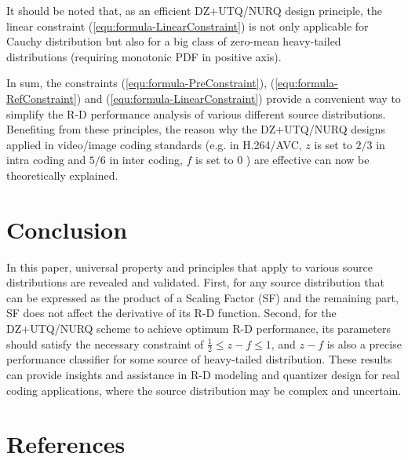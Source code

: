 \documentclass[smallabstract,smallcaptions]{dccpaper}
\begin{document}
It should be noted that, as an efficient DZ+UTQ/NURQ design principle, the linear constraint (\ref{equ:formula-LinearConstraint}) is not only applicable for Cauchy distribution but also for a big class of zero-mean heavy-tailed distributions (requiring monotonic PDF in positive axis).

In sum, the constraints (\ref{equ:formula-PreConstraint}), (\ref{equ:formula-RefConstraint}) and (\ref{equ:formula-LinearConstraint}) provide a convenient way to simplify the R-D performance analysis of various different source distributions. Benefiting from these principles, the reason why the DZ+UTQ/NURQ designs applied in video/image coding standards (e.g. in H.264/AVC, $z$ is set to $2/3$ in intra coding and $5/6$ in inter coding, $f$ is set to $0$ \cite{Sullivan_VCIP2005}) are effective can now be theoretically explained.

\section{Conclusion}
\label{sec:conclusion}

In this paper, universal property and principles that apply to various source distributions are revealed and validated. First, for any source distribution that can be expressed as the product of a Scaling Factor (SF) and the remaining part, SF does not affect the derivative of its R-D function. Second, for the DZ+UTQ/NURQ scheme to achieve optimum R-D performance, its parameters should satisfy the necessary constraint of $\frac{1}{2} \le z - f \le 1$, and $z - f$ is also a precise performance classifier for some source of heavy-tailed distribution. These results can provide insights and assistance in R-D modeling and quantizer design for real coding applications, where the source distribution may be complex and uncertain.

\section*{References}


\end{document}
